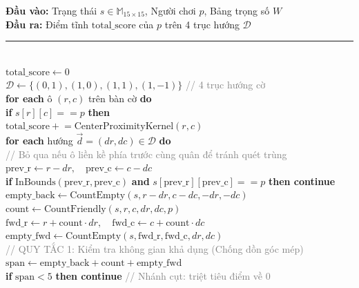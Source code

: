 \documentclass[11pt,a4paper]{article}
\begin{document}
\begin{tcolorbox}[breakable, enhanced, colback=lightbg, colframe=primary, arc=2pt, boxrule=1pt, title={\textbf{Thuật toán 1: Available Span Verification \& Gapped Pattern Scanning}}, coltitle=white, fonttitle=\small\bfseries]
\small
\textbf{Đầu vào:} Trạng thái $s \in \mathbb{M}_{15 \times 15}$, Người chơi $p$, Bảng trọng số $W$\\
\textbf{Đầu ra:} Điểm tĩnh $\text{total\_score}$ của $p$ trên 4 trục hướng $\mathcal{D}$\\[3pt]
\rule{\textwidth}{0.4pt}\\[4pt]
$\text{total\_score} \leftarrow 0$\\
$\mathcal{D} \leftarrow \{(0,1), (1,0), (1,1), (1,-1)\}$ \hfill\textcolor{gray}{// 4 trục hướng cờ}\\
\textbf{for each} ô $(r, c)$ trên bàn cờ \textbf{do}\\
\quad \textbf{if} $s[r][c] == p$ \textbf{then}\\
\quad\quad $\text{total\_score} \mathrel{+}= \text{CenterProximityKernel}(r, c)$\\
\quad\quad \textbf{for each} hướng $\vec{d} = (dr, dc) \in \mathcal{D}$ \textbf{do}\\
\quad\quad\quad \textcolor{gray}{// Bỏ qua nếu ô liền kề phía trước cùng quân để tránh quét trùng}\\
\quad\quad\quad $\text{prev\_r} \leftarrow r - dr, \quad \text{prev\_c} \leftarrow c - dc$\\
\quad\quad\quad \textbf{if} $\text{InBounds}(\text{prev\_r}, \text{prev\_c})$ \textbf{and} $s[\text{prev\_r}][\text{prev\_c}] == p$ \textbf{then continue}\\
\quad\quad\quad $\text{empty\_back} \leftarrow \text{CountEmpty}(s, r - dr, c - dc, -dr, -dc)$\\
\quad\quad\quad $\text{count} \leftarrow \text{CountFriendly}(s, r, c, dr, dc, p)$\\
\quad\quad\quad $\text{fwd\_r} \leftarrow r + \text{count} \cdot dr, \quad \text{fwd\_c} \leftarrow c + \text{count} \cdot dc$\\
\quad\quad\quad $\text{empty\_fwd} \leftarrow \text{CountEmpty}(s, \text{fwd\_r}, \text{fwd\_c}, dr, dc)$\\
\quad\quad\quad \textcolor{gray}{// QUY TẮC 1: Kiểm tra không gian khả dụng (Chống dồn góc mép)}\\
\quad\quad\quad $\text{span} \leftarrow \text{empty\_back} + \text{count} + \text{empty\_fwd}$\\
\quad\quad\quad \textbf{if} $\text{span} < 5$ \textbf{then continue} \hfill\textcolor{gray}{// Nhánh cụt: triệt tiêu điểm về 0}\\

\end{tcolorbox}
\end{document}

